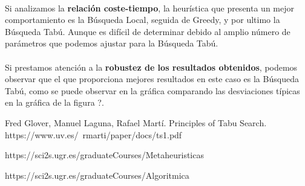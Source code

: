 \documentclass{article}
\begin{document}
	\paragraph{}Si analizamos la \textbf{relación coste-tiempo}, la heurística que presenta un mejor comportamiento es la Búsqueda Local, seguida de Greedy, y por ultimo la Búsqueda Tabú. Aunque es difícil de determinar debido al amplio número de parámetros que podemos ajustar para la Búsqueda Tabú.
	
	\paragraph{}Si prestamos atención a la \textbf{robustez de los resultados obtenidos}, podemos observar que el que proporciona mejores resultados en este caso es la Búsqueda Tabú, como se puede observar en la gráfica comparando las desviaciones típicas en la gráfica de la figura ?.
	
	\newpage
	
	\begin{thebibliography}{0}
		
		 Fred Glover, Manuel Laguna, Rafael Martí. Principles of Tabu Search. https://www.uv.es/~rmarti/paper/docs/ts1.pdf
		
		 https://sci2s.ugr.es/graduateCourses/Metaheuristicas
		
		https://sci2s.ugr.es/graduateCourses/Algoritmica
		
	\end{thebibliography}
	
\end{document}
